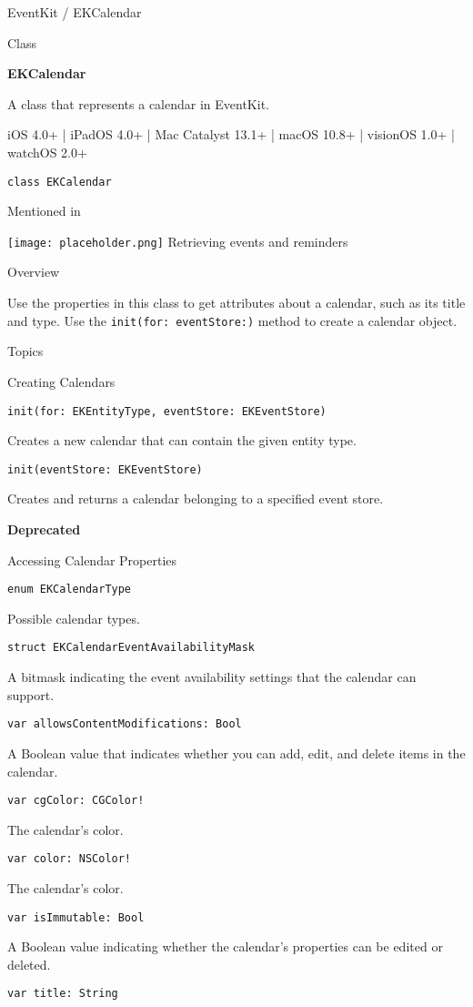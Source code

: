 \documentclass{article}
\title{}
\author{}
\date{}
\begin{document}
EventKit / EKCalendar

Class

\textbf{EKCalendar}

A class that represents a calendar in EventKit.

iOS 4.0+ | iPadOS 4.0+ | Mac Catalyst 13.1+ | macOS 10.8+ | visionOS 1.0+ | watchOS 2.0+

\texttt{class EKCalendar}

Mentioned in

\texttt{[image: placeholder.png]} Retrieving events and reminders

Overview

Use the properties in this class to get attributes about a calendar, such as its title and type. Use the \texttt{init(for: eventStore:)} method to create a calendar object.

Topics

Creating Calendars

\texttt{init(for: EKEntityType, eventStore: EKEventStore)}

Creates a new calendar that can contain the given entity type.

\texttt{init(eventStore: EKEventStore)}

Creates and returns a calendar belonging to a specified event store.

\textbf{Deprecated}

Accessing Calendar Properties

\texttt{enum EKCalendarType}

Possible calendar types.

\texttt{struct EKCalendarEventAvailabilityMask}

A bitmask indicating the event availability settings that the calendar can support.

\texttt{var allowsContentModifications: Bool}

A Boolean value that indicates whether you can add, edit, and delete items in the calendar.

\texttt{var cgColor: CGColor!}

The calendar's color.

\texttt{var color: NSColor!}

The calendar's color.

\texttt{var isImmutable: Bool}

A Boolean value indicating whether the calendar's properties can be edited or deleted.

\texttt{var title: String}
\end{document}
